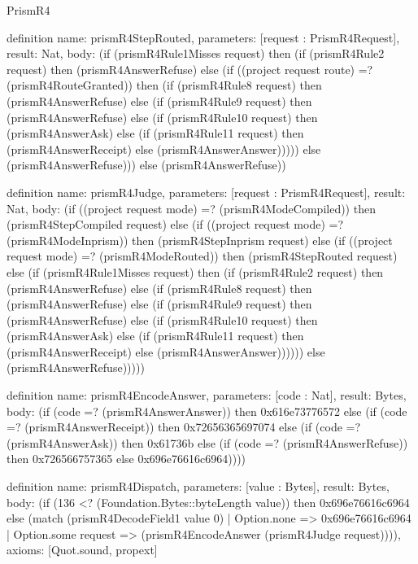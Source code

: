 \begin{lexlean}{PrismR4}
\begin{semanticmodule}
definition{
  name: prismR4StepRouted,
  parameters: [request : PrismR4Request],
  result: Nat,
  body: (if (prismR4Rule1Misses request) then (if (prismR4Rule2 request) then (prismR4AnswerRefuse) else (if ((project request route) =? (prismR4RouteGranted)) then (if (prismR4Rule8 request) then (prismR4AnswerRefuse) else (if (prismR4Rule9 request) then (prismR4AnswerRefuse) else (if (prismR4Rule10 request) then (prismR4AnswerAsk) else (if (prismR4Rule11 request) then (prismR4AnswerReceipt) else (prismR4AnswerAnswer))))) else (prismR4AnswerRefuse))) else (prismR4AnswerRefuse))
}

definition{
  name: prismR4Judge,
  parameters: [request : PrismR4Request],
  result: Nat,
  body: (if ((project request mode) =? (prismR4ModeCompiled)) then (prismR4StepCompiled request) else (if ((project request mode) =? (prismR4ModeInprism)) then (prismR4StepInprism request) else (if ((project request mode) =? (prismR4ModeRouted)) then (prismR4StepRouted request) else (if (prismR4Rule1Misses request) then (if (prismR4Rule2 request) then (prismR4AnswerRefuse) else (if (prismR4Rule8 request) then (prismR4AnswerRefuse) else (if (prismR4Rule9 request) then (prismR4AnswerRefuse) else (if (prismR4Rule10 request) then (prismR4AnswerAsk) else (if (prismR4Rule11 request) then (prismR4AnswerReceipt) else (prismR4AnswerAnswer)))))) else (prismR4AnswerRefuse)))))
}

definition{
  name: prismR4EncodeAnswer,
  parameters: [code : Nat],
  result: Bytes,
  body: (if (code =? (prismR4AnswerAnswer)) then 0x616e73776572 else (if (code =? (prismR4AnswerReceipt)) then 0x72656365697074 else (if (code =? (prismR4AnswerAsk)) then 0x61736b else (if (code =? (prismR4AnswerRefuse)) then 0x726566757365 else 0x696e76616c6964))))
}

definition{
  name: prismR4Dispatch,
  parameters: [value : Bytes],
  result: Bytes,
  body: (if (136 <? (Foundation.Bytes::byteLength value)) then 0x696e76616c6964 else (match (prismR4DecodeField1 value 0)
    | Option.none => 0x696e76616c6964
    | Option.some request => (prismR4EncodeAnswer (prismR4Judge request)))),
  axioms: [Quot.sound, propext]
}
\end{semanticmodule}
\end{lexlean}
